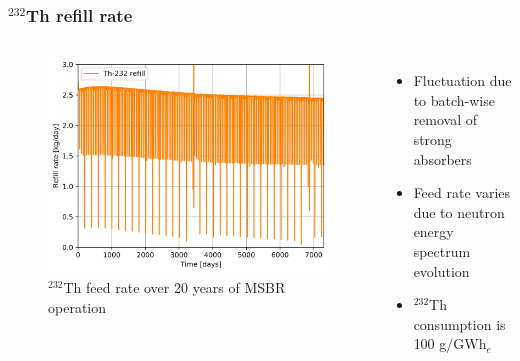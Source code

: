 \begin{frame}
  \frametitle{$^{232}$Th refill rate}
    \begin{columns}
    \column[t]{7cm}
   \vspace{-0.35in}
  \begin{figure}[t]
   \hspace*{-0.2in}
   \includegraphics[height=0.75\textheight]{./images/Th_refill_rate.png}
   \vspace{-0.05in}
   \caption{$^{232}$Th feed rate over 20 years of \gls{MSBR} operation}
    \end{figure}

    \column[t]{4.5cm}
       \begin{itemize}
	        \item Fluctuation due to batch-wise removal of strong absorbers
   		\item Feed rate varies due to neutron energy spectrum evolution
   		\item $^{232}$Th consumption is 100 g/GWh$_e$
       \end{itemize}
     \end{columns}
\end{frame}

